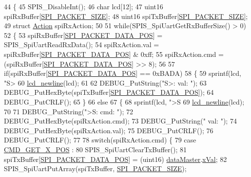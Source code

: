 \begin{DoxyCode}
44 \{
45   SPIS\_DisableInt();
46   \textcolor{keywordtype}{char} lcd[12];
47   uint16 spiRxBuffer[\hyperlink{spi_8h_aea54fc09a960e5a1b7096374f3eebee4}{SPI\_PACKET\_SIZE}];
48   uint16 spiTxBuffer[\hyperlink{spi_8h_aea54fc09a960e5a1b7096374f3eebee4}{SPI\_PACKET\_SIZE}];
49   \textcolor{keyword}{struct }\hyperlink{queue_8h_struct_action}{Action} spiRxAction;
50   
51   \textcolor{keywordflow}{while}(SPIS\_SpiUartGetRxBufferSize() > 0)
52   \{
53     spiRxBuffer[\hyperlink{spi_8h_a5ffe58623f478b7b960a1349530a6655}{SPI\_PACKET\_DATA\_POS}] = SPIS\_SpiUartReadRxData();
54     spiRxAction.val = spiRxBuffer[\hyperlink{spi_8h_a5ffe58623f478b7b960a1349530a6655}{SPI\_PACKET\_DATA\_POS}] & 0xff;
55     spiRxAction.cmd = (spiRxBuffer[\hyperlink{spi_8h_a5ffe58623f478b7b960a1349530a6655}{SPI\_PACKET\_DATA\_POS}] >> 8);
56     
57     \textcolor{keywordflow}{if}(spiRxBuffer[\hyperlink{spi_8h_a5ffe58623f478b7b960a1349530a6655}{SPI\_PACKET\_DATA\_POS}] == 0xBADA)
58     \{
59       sprintf(lcd, \textcolor{stringliteral}{"S> %
60       \hyperlink{lcd_8h_a507dd352aee8161dc556e3d1439a2be2}{lcd\_newline}(lcd);
61       
62       DEBUG\_PutString(\textcolor{stringliteral}{"S>: val: "});
63       DEBUG\_PutHexByte(spiTxBuffer[\hyperlink{spi_8h_a5ffe58623f478b7b960a1349530a6655}{SPI\_PACKET\_DATA\_POS}]);
64       DEBUG\_PutCRLF();
65     \}
66     \textcolor{keywordflow}{else}
67     \{
68       sprintf(lcd, \textcolor{stringliteral}{">S %
69       \hyperlink{lcd_8h_a507dd352aee8161dc556e3d1439a2be2}{lcd\_newline}(lcd);
70       
71       DEBUG\_PutString(\textcolor{stringliteral}{">S: cmd: "});
72       DEBUG\_PutHexByte(spiRxAction.cmd);
73       DEBUG\_PutString(\textcolor{stringliteral}{" val: "});
74       DEBUG\_PutHexByte(spiRxAction.val);
75       DEBUG\_PutCRLF();
76       DEBUG\_PutCRLF();
77       
78       \textcolor{keywordflow}{switch}(spiRxAction.cmd) \{
79         \textcolor{keywordflow}{case} \hyperlink{handler_8h_aa50e083669624eeaef782ebc867008f9}{CMD\_GET\_X\_POS} :
80           SPIS\_SpiUartClearTxBuffer();
81           spiTxBuffer[\hyperlink{spi_8h_a5ffe58623f478b7b960a1349530a6655}{SPI\_PACKET\_DATA\_POS}] = (uint16)
      \hyperlink{data_8h_a6b1a8871e30b304a6f5764c44d89e489}{dataMaster}.\hyperlink{data_8h_a7849f509240fa25127fcda8c5009f02b}{xVal};
82           SPIS\_SpiUartPutArray(spiTxBuffer, \hyperlink{spi_8h_aea54fc09a960e5a1b7096374f3eebee4}{SPI\_PACKET\_SIZE});
}}
\end{DoxyCode}
